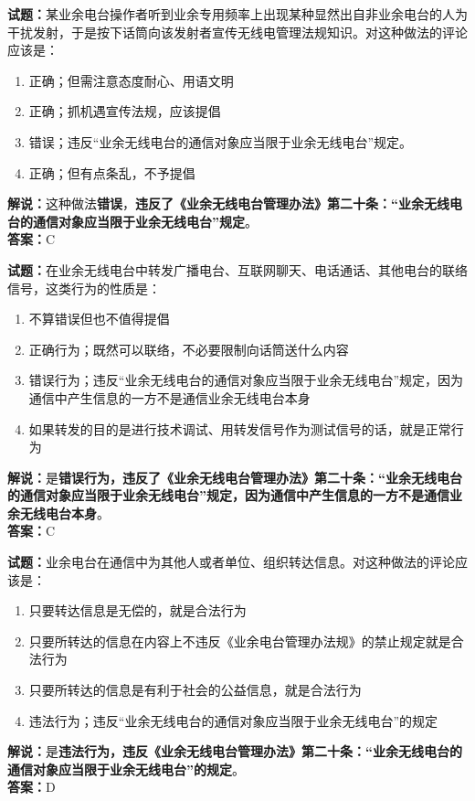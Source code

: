 \documentclass{ctexbook}
\begin{document}
\bigskip




\noindent\textbf{试题：}某业余电台操作者听到业余专用频率上出现某种显然出自非业余电台的人为干扰发射，于是按下话筒向该发射者宣传无线电管理法规知识。对这种做法的评论应该是：
\begin{enumerate}[leftmargin=3em]
\item 正确；但需注意态度耐心、用语文明
\item 正确；抓机遇宣传法规，应该提倡
\item 错误；违反“业余无线电台的通信对象应当限于业余无线电台”规定。
\item 正确；但有点条乱，不予提倡
\end{enumerate}
\noindent\textbf{解说：}这种做法\textbf{错误}，\textbf{违反了《业余无线电台管理办法》第二十条：“业余无线电台的通信对象应当限于业余无线电台”规定}。\\\noindent\textbf{答案：}C

\bigskip




\noindent\textbf{试题：}在业余无线电台中转发广播电台、互联网聊天、电话通话、其他电台的联络信号，这类行为的性质是：
\begin{enumerate}[leftmargin=3em]
\item 不算错误但也不值得提倡
\item 正确行为；既然可以联络，不必要限制向话筒送什么内容
\item 错误行为；违反“业余无线电台的通信对象应当限于业余无线电台”规定，因为通信中产生信息的一方不是通信业余无线电台本身
\item 如果转发的目的是进行技术调试、用转发信号作为测试信号的话，就是正常行为
\end{enumerate}
\noindent\textbf{解说：}是\textbf{错误行为，违反了《业余无线电台管理办法》第二十条：“业余无线电台的通信对象应当限于业余无线电台”规定，因为通信中产生信息的一方不是通信业余无线电台本身}。\\\noindent\textbf{答案：}C

\bigskip




\noindent\textbf{试题：}业余电台在通信中为其他人或者单位、组织转达信息。对这种做法的评论应该是：
\begin{enumerate}[leftmargin=3em]
\item 只要转达信息是无偿的，就是合法行为
\item 只要所转达的信息在内容上不违反《业余电台管理办法规》的禁止规定就是合法行为
\item 只要所转达的信息是有利于社会的公益信息，就是合法行为
\item 违法行为；违反“业余无线电台的通信对象应当限于业余无线电台”的规定
\end{enumerate}
\noindent\textbf{解说：}是\textbf{违法行为，违反《业余无线电台管理办法》第二十条：“业余无线电台的通信对象应当限于业余无线电台”的规定}。\\\noindent\textbf{答案：}D
\end{document}
